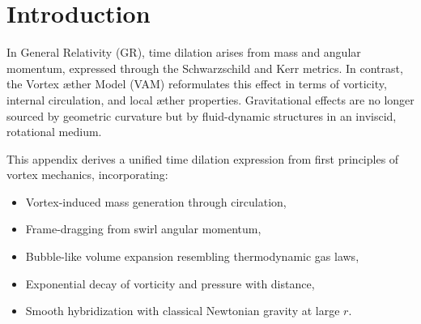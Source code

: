 \documentclass[preprint]{revtex4-2}
\begin{document}
\begin{abstract}
    We present a unified time dilation formula derived from the Vortex \AE{}ther Model (VAM), a fluid-dynamic reformulation of gravitation and mass-energy interactions. Unlike General Relativity, where mass and curvature govern clock rates, VAM attributes gravitational phenomena to quantized vorticity, \ae{}ther circulation, and swirl-induced pressure gradients. The proposed equation replaces the Schwarzschild and Kerr metric terms with vortex core tangential velocities, swirl angular frequencies, and an effective mass derived from exponentially decaying \ae{}ther density. A hybridization mechanism smoothly interpolates between vortex-scale gravity and classical Newtonian coupling at macroscopic distances. The final expression captures six physical effects within one coherent framework: (1) vortex-induced mass generation via circulation and helicity, (2) bubble-like volume expansion due to internal irrotational flow, (3) acceleration of this flow under compression, (4) thermal-like energy response from swirl speedup, (5) relativistic time dilation from \ae{}ther puncture during motion, and (6) swirl-based core-local time. The result is a mathematically robust, numerically testable model that unifies quantum vortex dynamics with gravitational time effects and remains non-singular across all radial domains.
\end{abstract}

\section*{Introduction}
In General Relativity (GR), time dilation arises from mass and angular momentum, expressed through the Schwarzschild and Kerr metrics. In contrast, the Vortex \ae{}ther Model (VAM) reformulates this effect in terms of vorticity, internal circulation, and local \ae{}ther properties. Gravitational effects are no longer sourced by geometric curvature but by fluid-dynamic structures in an inviscid, rotational medium.

This appendix derives a unified time dilation expression from first principles of vortex mechanics, incorporating:

\begin{itemize}
    \item Vortex-induced mass generation through circulation,
    \item Frame-dragging from swirl angular momentum,
    \item Bubble-like volume expansion resembling thermodynamic gas laws,
    \item Exponential decay of vorticity and pressure with distance,
    \item Smooth hybridization with classical Newtonian gravity at large $r$.
\end{itemize}
\end{document}
